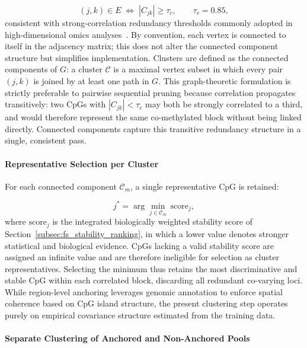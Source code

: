 \begin{equation}
(j,k) \in E
\;\Longleftrightarrow\;
|C_{jk}| \geq \tau_c,
\qquad
\tau_c = 0.85,
\label{eq:corr_graph}
\end{equation}
consistent with strong-correlation redundancy thresholds 
commonly adopted in high-dimensional omics 
analyses~\cite{Witten2010, Friedman2010}. By convention, each vertex is connected to itself in the adjacency matrix; 
this does not alter the connected component structure but simplifies 
implementation. Clusters are 
defined as the connected components of $G$: a cluster 
$\mathcal{C}$ is a maximal vertex subset in which every 
pair $(j,k)$ is joined by at least one path in $G$.
This graph-theoretic formulation is strictly preferable 
to pairwise sequential pruning because correlation 
propagates transitively: two CpGs with $|C_{jk}| < \tau_c$ 
may both be strongly correlated to a third, and would 
therefore represent the same co-methylated block without 
being linked directly. Connected components capture this 
transitive redundancy structure in a single, consistent pass.

\paragraph{Representative Selection per Cluster}

For each connected component $\mathcal{C}_m$, a single 
representative CpG is retained:

\begin{equation}
j^*
=
\arg\min_{j \in \mathcal{C}_m}
\,\mathrm{score}_j,
\label{eq:cluster_rep}
\end{equation}
where $\mathrm{score}_j$ is the integrated biologically 
weighted stability score of 
Section~\ref{subsec:fs_stability_ranking}, in which a 
lower value denotes stronger statistical and biological 
evidence. CpGs lacking a valid stability score are assigned an infinite value and are 
therefore ineligible for selection as cluster representatives. Selecting the minimum thus retains the most 
discriminative and stable CpG within each correlated 
block, discarding all redundant co-varying loci. While region-level anchoring leverages genomic annotation to enforce spatial 
coherence based on CpG island structure, the present clustering step operates 
purely on empirical covariance structure estimated from the training data.

\paragraph{Separate Clustering of Anchored and Non-Anchored Pools}

